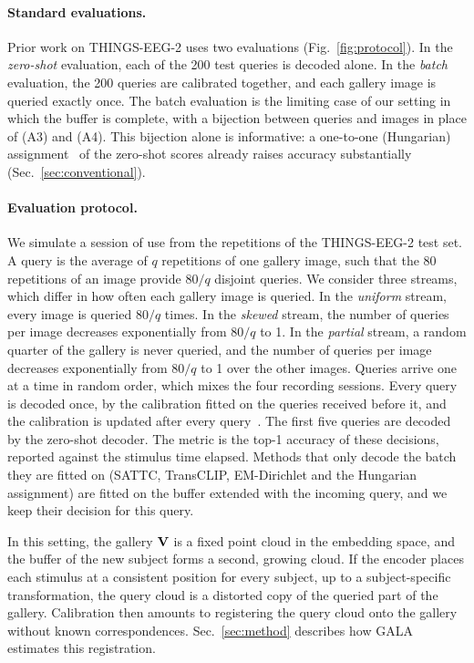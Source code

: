 \documentclass[10pt,twocolumn,letterpaper]{article}
\begin{document}
\paragraph{Standard evaluations.}
Prior work on THINGS-EEG-2 uses two evaluations (Fig.~\ref{fig:protocol}). In the \emph{zero-shot} evaluation, each of the 200 test queries is decoded alone. In the \emph{batch} evaluation, the 200 queries are calibrated together, and each gallery image is queried exactly once. The batch evaluation is the limiting case of our setting in which the buffer is complete, with a bijection between queries and images in place of (A3) and (A4). This bijection alone is informative: a one-to-one (Hungarian) assignment~\cite{kuhn1955hungarian} of the zero-shot scores already raises accuracy substantially (Sec.~\ref{sec:conventional}).

\paragraph{Evaluation protocol.}
We simulate a session of use from the repetitions of the THINGS-EEG-2 test set. A query is the average of $q$ repetitions of one gallery image, such that the 80 repetitions of an image provide $80/q$ disjoint queries. We consider three streams, which differ in how often each gallery image is queried. In the \emph{uniform} stream, every image is queried $80/q$ times. In the \emph{skewed} stream, the number of queries per image decreases exponentially from $80/q$ to 1. In the \emph{partial} stream, a random quarter of the gallery is never queried, and the number of queries per image decreases exponentially from $80/q$ to 1 over the other images. Queries arrive one at a time in random order, which mixes the four recording sessions. Every query is decoded once, by the calibration fitted on the queries received before it, and the calibration is updated after every query~\cite{dawid1984prequential}. The first five queries are decoded by the zero-shot decoder. The metric is the top-1 accuracy of these decisions, reported against the stimulus time elapsed. Methods that only decode the batch they are fitted on (SATTC, TransCLIP, EM-Dirichlet and the Hungarian assignment) are fitted on the buffer extended with the incoming query, and we keep their decision for this query. 

In this setting, the gallery ${\bf V}$ is a fixed point cloud in the embedding space, and the buffer of the new subject forms a second, growing cloud. If the encoder places each stimulus at a consistent position for every subject, up to a subject-specific transformation, the query cloud is a distorted copy of the queried part of the gallery. Calibration then amounts to registering the query cloud onto the gallery without known correspondences. Sec.~\ref{sec:method} describes how GALA estimates this registration.
\end{document}
